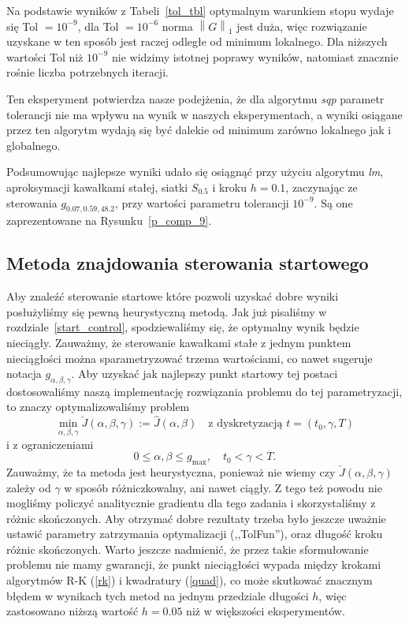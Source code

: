 \documentclass[11pt]{article}
\newcommand{\norm}[1]{\left\lVert#1\right\rVert}
\begin{document}
Na podstawie wyników z Tabeli~\ref{tol_tbl} optymalnym warunkiem stopu wydaje się Tol $= 10^{-9}$, dla Tol $= 10^{-6}$ norma $\norm{G}_1$ jest duża, więc rozwiązanie uzyskane w ten sposób jest raczej odległe od minimum lokalnego. Dla niższych wartości Tol niż $10^{-9}$ nie widzimy istotnej poprawy wyników, natomiast znacznie rośnie liczba potrzebnych iteracji.

Ten eksperyment potwierdza nasze podejżenia, że dla algorytmu {\it sqp\/} parametr tolerancji nie ma wpływu na wynik w naszych eksperymentach, a wyniki osiągane przez ten algorytm wydają się być dalekie od minimum zarówno lokalnego jak i globalnego.

Podsumowując najlepsze wyniki udało się osiągnąć przy użyciu algorytmu {\it lm}, aproksymacji kawałkami stałej, siatki $S_{0.5}$ i kroku $h = 0.1$, zaczynając ze sterowania $g_{0.07,0.59,48.2}$, przy wartości parametru tolerancji $10^{-9}$. Są one zaprezentowane na Rysunku~\ref{p_comp_9}.

\subsection{Metoda znajdowania sterowania startowego}\label{start_method}

Aby znaleźć sterowanie startowe które pozwoli uzyskać dobre wyniki posłużyliśmy się pewną heurystyczną metodą. Jak już pisaliśmy w rozdziale~\ref{start_control}, spodziewaliśmy się, że optymalny wynik będzie nieciągły. Zauważmy, że sterowanie kawałkami stałe z jednym punktem nieciągłości można sparametryzować trzema wartościami, co nawet sugeruje notacja $g_{\alpha,\beta,\gamma}$. Aby uzyskać jak najlepszy punkt startowy tej postaci dostosowaliśmy naszą implementację rozwiązania problemu do tej parametryzacji, to znaczy optymalizowaliśmy problem
\begin{equation}
  \min_{\alpha,\beta,\gamma} \check{J}(\alpha,\beta,\gamma) := \hat{J}(\alpha, \beta)\quad \text{z dyskretyzacją } t = (t_0, \gamma, T)
\end{equation}
i z ograniczeniami
\begin{equation}
  0 \le \alpha,\beta \le g_{\max}, \quad t_0 < \gamma < T.
\end{equation}
Zauważmy, że ta metoda jest heurystyczna, ponieważ nie wiemy czy $\check{J}(\alpha,\beta,\gamma)$ zależy od $\gamma$ w sposób różniczkowalny, ani nawet ciągły. Z tego też powodu nie mogliśmy policzyć analitycznie gradientu dla tego zadania i skorzystaliśmy z różnic skończonych. Aby otrzymać dobre rezultaty trzeba było jeszcze uważnie ustawić parametry zatrzymania optymalizacji (,,TolFun''), oraz długość kroku różnic skończonych. Warto jeszcze nadmienić, że przez takie sformułowanie problemu nie mamy gwarancji, że punkt nieciągłości wypada między krokami algorytmów R-K (\ref{rk}) i kwadratury (\ref{quad}), co może skutkować znacznym błędem w wynikach tych metod na jednym przedziale długości $h$, więc zastosowano niższą wartość $h = 0.05$ niż w większości eksperymentów.
\end{document}
